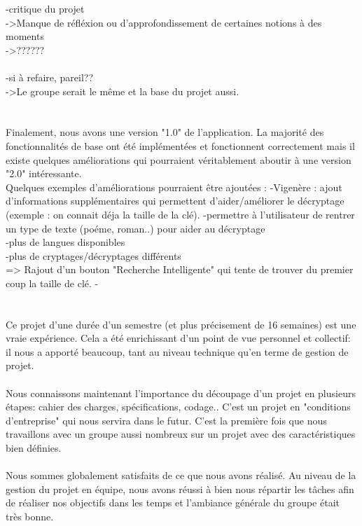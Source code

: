 \documentclass[a4]{article}
\begin{document}
	-critique du projet \\
	->Manque de réfléxion ou d'approfondissement de certaines notions à des moments \\
	->?????? \\ \\
	
	
		
	-si à refaire, pareil?? \\
	->Le groupe serait le même et la base du projet aussi. \\ \\ \\
	
	
	Finalement, nous avons une version "1.0" de l’application. La majorité des fonctionnalités
de base ont été implémentées et fonctionnent correctement mais il existe quelques
améliorations qui pourraient véritablement aboutir à une version "2.0" intéressante. \\
Quelques exemples d'améliorations pourraient être ajoutées :
-Vigenère : ajout d'informations supplémentaires qui permettent d'aider/améliorer le décryptage 
(exemple : on connait déja la taille de la clé).
-permettre à l'utilisateur de rentrer un type de texte (poéme, roman..) pour aider au décryptage \\
-plus de langues disponibles \\
-plus de cryptages/décryptages différents \\
=> Rajout d'un bouton "Recherche Intelligente" qui tente de trouver du premier coup la taille de clé.
-\\ \\ \\

	
	
Ce projet d'une durée d'un semestre (et plus précisement de 16 semaines) est une vraie expérience.
Cela a été enrichissant d'un point de vue personnel et collectif:
il nous a apporté beaucoup, tant au
niveau technique qu’en terme de gestion de projet.  \\  \\
Nous connaissons maintenant l'importance du découpage d'un projet en plusieurs étapes: cahier des charges, spécifications, codage..
C'est un projet en "conditions d'entreprise" qui nous servira dans le futur.
C’est la première fois que nous travaillons avec un groupe aussi nombreux sur un projet avec des caractéristiques bien définies. \\ \\
Nous sommes globalement satisfaits de ce que nous avons réalisé.
Au niveau de la gestion du projet en équipe, nous avons réussi à bien nous répartir les
tâches afin de réaliser nos objectifs dans les temps et l'ambiance générale du groupe était très bonne. \\ \\ \\


	
\end{document}
